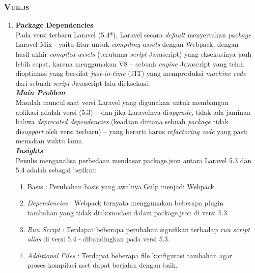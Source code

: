 \subsubsection{\textsc{Vue.js}}
	
\begin{enumerate}\bfseries
\item \textbf{Package Dependencies} \\
    \indentenum Pada versi terbaru Laravel (5.4*), Laravel secara \textit{default} menyertakan \textit{package} Laravel Mix - yaitu fitur untuk \textit{compiling assets} dengan Webpack, dengan hasil akhir \textit{compiled assets} (terutama \textit{script} Javascript) yang eksekusinya jauh lebih cepat, karena menggunakan V8 -- sebuah \textit{engine} Javascript yang telah dioptimasi yang bersifat \textit{just-in-time} (JIT) yang memproduksi \textit{machine code} dari sebuah \textit{script} Javascript lalu dieksekusi.\\
  
  \textbf{\textit{Main Problem}} \\
  \indentenum Masalah muncul saat versi Laravel yang digunakan untuk membangun aplikasi adalah versi (5.3) -- dan jika Laravelnya di\textit{upgrade}, tidak ada jaminan bahwa \textit{deprecated dependencies} (keadaan dimana sebuah \textit{package} tidak di\textit{support} oleh versi terbaru) -- yang berarti harus \textit{refactoring code} yang pasti memakan waktu lama.\\			  

	\textbf{\textit{Insights}} \\
	  \indentenum Penulis menganalisa perbedaan mendasar package.json antara Laravel 5.3 dan 5.4 adalah sebagai berikut:
	\begin{enumerate}
  	  	\item Basis : Perubahan basis yang awalnya Gulp menjadi Webpack
  	  	\item \textit{Dependencies} : Webpack ternyata menggunakan beberapa plugin tambahan yang tidak diakomodasi dalam package.json di versi 5.3
  	  	\item \textit{Run Script} : Terdapat beberapa perubahan signifikan terhadap \textit{run script alias} di versi 5.4 - dibandingkan pada versi 5.3.
  	  	\item \textit{Additional Files} : Terdapat beberapa file konfigurasi tambahan agar proses kompilasi aset dapat berjalan dengan baik.
	\end{enumerate}
	\ \\
  

\end{enumerate}
